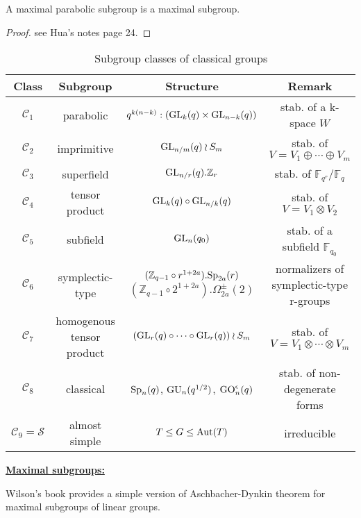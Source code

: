 \documentclass[a4paper,11pt]{article}
\begin{document}
\begin{proposition}
    A maximal parabolic subgroup is a maximal subgroup.
\end{proposition}
\begin{proof}
    see Hua's notes page 24.
\end{proof}

\begin{table*}[htbp]
\centering
\begin{tabular}{cccc}
    \toprule
    Class & Subgroup & Structure & Remark\\
    \midrule
    $\mathscr{C}_1$ & parabolic & $q^{k(n-k)}:(\mathrm{GL}_k(q)\times \mathrm{GL}_{n-k}(q))$ & stab. of a k-space $W$\\
    $\mathscr{C}_2$ & imprimitive & $\mathrm{GL}_{n/m}(q)\wr S_m$ & stab. of $V=V_1\oplus\cdots\oplus V_m$\\
    $\mathscr{C}_3$ & superfield & $\mathrm{GL}_{n/r}(q).\mathbb{Z}_r$ & stab. of $\mathbb{F}_{q^r}/\mathbb{F}_q$\\
    $\mathscr{C}_4$ & tensor product & $\mathrm{GL}_k(q)\circ\mathrm{GL}_{n/k}(q)$ & stab. of $V=V_1\otimes V_2$\\
    $\mathscr{C}_5$ & subfield & $\mathrm{GL}_n(q_0)$ & stab. of a subfield $\mathbb{F}_{q_0}$\\
    $\mathscr{C}_6$ & symplectic-type & \makecell{$(\mathbb{Z}_{q-1}\circ r^{1+2a}).\mathrm{Sp}_{2a}(r)$\\ $(\mathbb{Z}_{q-1}\circ 2^{1+2a}).\Omega_{2a}^{\pm}(2)$}  & normalizers of symplectic-type r-groups\\
    $\mathscr{C}_7$ & \makecell{homogenous\\ tensor product} & $(\mathrm{GL}_r(q)\circ\cdots\circ\mathrm{GL}_r(q))\wr S_m$ & stab. of $V=V_1\otimes\cdots\otimes V_m$\\
    $\mathscr{C}_8$ & classical & $\mathrm{Sp}_n(q)$, $\mathrm{GU}_n(q^{1/2})$, $\mathrm{GO}_n^\epsilon(q)$ & stab. of non-degenerate forms\\
    $\mathscr{C}_9=\mathscr{S}$ & almost simple & $T\leq G\leq \mathrm{Aut}(T)$ & irreducible\\
    \bottomrule
\end{tabular}
\caption{Subgroup classes of classical groups}
\end{table*}

\noindent\textbf{\underline{Maximal subgroups:}}

Wilson's book provides a simple version of Aschbacher-Dynkin theorem for maximal subgroups of linear groups.
\end{document}
